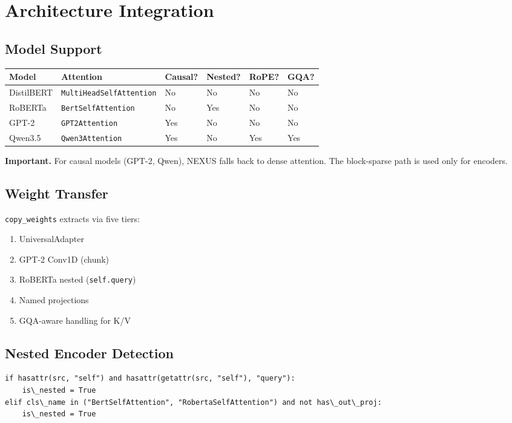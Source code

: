 \section{Architecture Integration}

\subsection{Model Support}

\begin{table}[H]
\centering
\small
\begin{tabular}{llllll}
\toprule
\textbf{Model} & \textbf{Attention} & \textbf{Causal?} & \textbf{Nested?} & \textbf{RoPE?} & \textbf{GQA?} \\
\midrule
DistilBERT & \texttt{MultiHeadSelfAttention} & No & No & No & No \\
RoBERTa & \texttt{BertSelfAttention} & No & Yes & No & No \\
GPT-2 & \texttt{GPT2Attention} & Yes & No & No & No \\
Qwen3.5 & \texttt{Qwen3Attention} & Yes & No & Yes & Yes \\
\bottomrule
\end{tabular}
\end{table}

\textbf{Important.} For causal models (GPT-2, Qwen), NEXUS falls back to dense 
attention. The block-sparse path is used only for encoders.

\subsection{Weight Transfer}

\texttt{copy\_weights} extracts via five tiers:

\begin{enumerate}
\item UniversalAdapter
\item GPT-2 Conv1D (chunk)
\item RoBERTa nested (\texttt{self.query})
\item Named projections
\item GQA-aware handling for K/V

\end{enumerate}
\subsection{Nested Encoder Detection}

\begin{lstlisting}
if hasattr(src, "self") and hasattr(getattr(src, "self"), "query"):
    is\_nested = True
elif cls\_name in ("BertSelfAttention", "RobertaSelfAttention") and not has\_out\_proj:
    is\_nested = True
\end{lstlisting}

